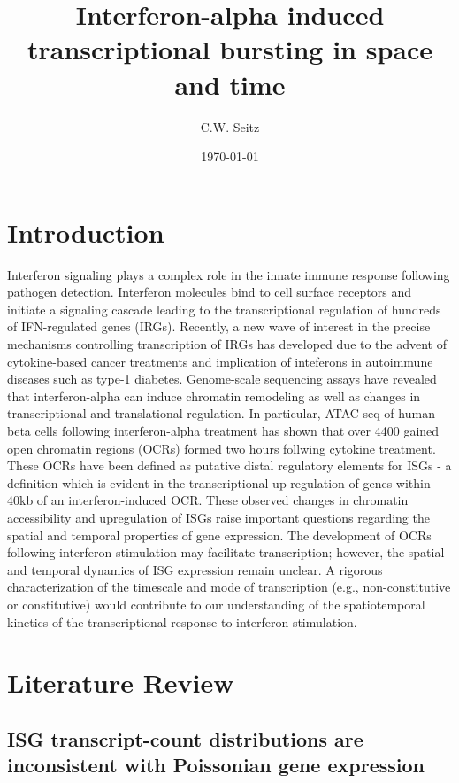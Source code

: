 \documentclass{article}
\title{Interferon-alpha induced transcriptional bursting in space and time}
\author{C.W. Seitz}
\date{\today}
\begin{document}
\maketitle

\section{Introduction}

Interferon signaling plays a complex role in the innate immune response following pathogen detection. Interferon molecules bind to cell surface receptors and initiate a signaling cascade leading to the transcriptional regulation of hundreds of IFN-regulated genes (IRGs). Recently, a new wave of interest in the precise mechanisms controlling transcription of IRGs has developed due to the advent of cytokine-based cancer treatments and implication of inteferons in autoimmune diseases such as type-1 diabetes. Genome-scale sequencing assays have revealed that interferon-alpha can induce chromatin remodeling as well as changes in transcriptional and translational regulation. In particular, ATAC-seq of human beta cells following interferon-alpha treatment has shown that over 4400 gained open chromatin regions (OCRs) formed two hours follwing cytokine treatment. These OCRs have been defined as putative distal regulatory elements for ISGs - a definition which is evident in the transcriptional up-regulation of genes within 40kb of an interferon-induced OCR. These observed changes in chromatin accessibility and upregulation of ISGs raise important questions regarding the spatial and temporal properties of gene expression. The development of OCRs following interferon stimulation may facilitate transcription; however, the spatial and temporal dynamics of ISG expression remain unclear. A rigorous characterization of the timescale and mode of transcription (e.g., non-constitutive or constitutive) would contribute to our understanding of the spatiotemporal kinetics of the transcriptional response to interferon stimulation.   

\section{Literature Review}

\subsection{ISG transcript-count distributions are inconsistent with Poissonian gene expression}
\end{document}
